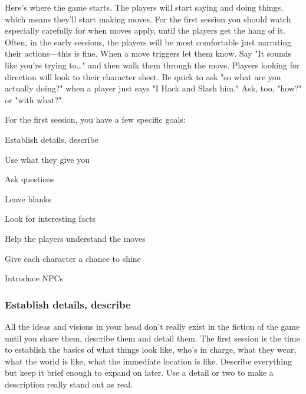  

Here's where the game starts. The players will start saying and doing things, which means they'll start making moves. For the first session you should watch especially carefully for when moves apply, until the players get the hang of it. Often, in the early sessions, the players will be most comfortable just narrating their actions—this is fine. When a move triggers let them know. Say "It sounds like you're trying to…" and then walk them through the move. Players looking for direction will look to their character sheet. Be quick to ask "so what are you actually doing?" when a player just says "I Hack and Slash him." Ask, too, "how?" or "with what?".

 

For the first session, you have a few specific goals:

 
\startitemize[1,packed]

\item Establish details, describe

 
\item Use what they give you

 
\item Ask questions

 
\item Leave blanks

 
\item Look for interesting facts

 
\item Help the players understand the moves

 
\item Give each character a chance to shine

 
\item Introduce NPCs


\stopitemize
 
\subsubsection{Establish details, describe}     
 

All the ideas and visions in your head don't really exist in the fiction of the game until you share them, describe them and detail them. The first session is the time to establish the basics of what things look like, who's in charge, what they wear, what the world is like, what the immediate location is like. Describe everything but keep it brief enough to expand on later. Use a detail or two to make a description really stand out as real.

